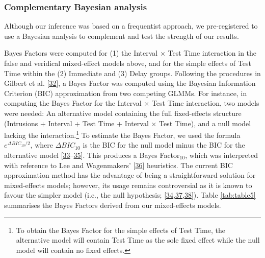 \documentclass[
]{article}
\begin{document}
\hypertarget{complementary-bayesian-analysis}{%
\subsubsection{Complementary Bayesian analysis}\label{complementary-bayesian-analysis}}

Although our inference was based on a frequentist approach, we pre-registered to use a Bayesian analysis to complement and test the strength of our results.

Bayes Factors were computed for (1) the Interval \(\times\) Test Time interaction in the false and veridical mixed-effect models above, and for the simple effects of Test Time within the (2) Immediate and (3) Delay groups. Following the procedures in Gilbert et al. {[}\protect\hyperlink{ref-gilbert2018a}{32}{]}, a Bayes Factor was computed using the Bayesian Information Criterion (BIC) approximation from two competing GLMMs. For instance, in computing the Bayes Factor for the Interval \(\times\) Test Time interaction, two models were needed: An alternative model containing the full fixed-effects structure (Intrusions + Interval + Test Time + Interval \(\times\) Test Time), and a null model lacking the interaction.\footnote{To obtain the Bayes Factor for the simple effects of Test Time, the alternative model will contain Test Time as the sole fixed effect while the null model will contain no fixed effects.} To estimate the Bayes Factor, we used the formula \(e^{\Delta BIC_{10}/2}\), where \(\Delta BIC_{10}\) is the BIC for the null model minus the BIC for the alternative model {[}\protect\hyperlink{ref-masson2011a}{33}--\protect\hyperlink{ref-wagenmakers2007a}{35}{]}. This produces a Bayes Factor\(_{10}\), which was interpreted with reference to Lee and Wagenmakers' {[}\protect\hyperlink{ref-lee2014a}{36}{]} heuristics. The current BIC approximation method has the advantage of being a straightforward solution for mixed-effects models; however, its usage remains controversial as it is known to favour the simpler model (i.e., the null hypothesis; {[}\protect\hyperlink{ref-lindelov2018a}{34},\protect\hyperlink{ref-vandekerckhove2014a}{37},\protect\hyperlink{ref-weakliem1999a}{38}{]}). Table \ref{tab:table5} summarises the Bayes Factors derived from our mixed-effects models.
\end{document}
